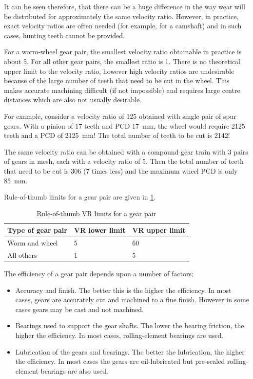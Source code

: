 It can be seen therefore, that there can be a huge difference in the way wear will be distributed for approximately the same velocity ratio. However, in practice, exact velocity ratios are often needed (for example, for a camshaft) and in such cases, hunting teeth cannot be provided.

For a worm-wheel gear pair, the smallest velocity ratio obtainable in practice is about 5. For all other gear pairs, the smallest ratio is 1. There is no theoretical upper limit to the velocity ratio, however high velocity ratios are undesirable because of the large number of teeth that need to be cut in the wheel. This makes accurate machining difficult (if not impossible) and requires large centre distances which are also not usually desirable.

For example, consider a velocity ratio of 125 obtained with single pair of spur gears. With a pinion of 17 teeth and PCD \SI{17}{\milli\metre}, the wheel would require 2125 teeth and a PCD of \SI{2125}{\milli\metre}! The total number of teeth to be cut is 2142!

The same velocity ratio can be obtained with a compound gear train with 3 pairs of gears in mesh, each with a velocity ratio of 5. Then the total number of teeth that need to be cut is 306 (7 times less) and the maximum wheel PCD is only \SI{85}{\milli\metre}.

Rule-of-thumb limits for a gear pair are given in \cref{tbl-2}.

\begin{table}[h]
  \caption{Rule-of-thumb VR limits for a gear pair}
  \label{tbl-2}
  \center
  \begin{tabular}{p{} p{} p{}}
    \toprule
    Type of gear pair & VR lower limit & VR upper limit \\
    \midrule
    Worm and wheel & 5 & 60 \\
    All others & 1 & 5 \\
    \bottomrule
  \end{tabular}
\end{table}

The efficiency of a gear pair depends upon a number of factors:

\begin{itemize}
  \item Accuracy and finish. The better this is the higher the efficiency. In most cases, gears are accurately cut and machined to a fine finish. However in some cases gears may be cast and not machined.
  \item Bearings used to support the gear shafts. The lower the bearing friction, the higher the efficiency. In most cases, rolling-element bearings are used.
  \item Lubrication of the gears and bearings. The better the lubrication, the higher the efficiency. In most cases the gears are oil-lubricated but pre-sealed rolling-element bearings are also used.
\end{itemize}

